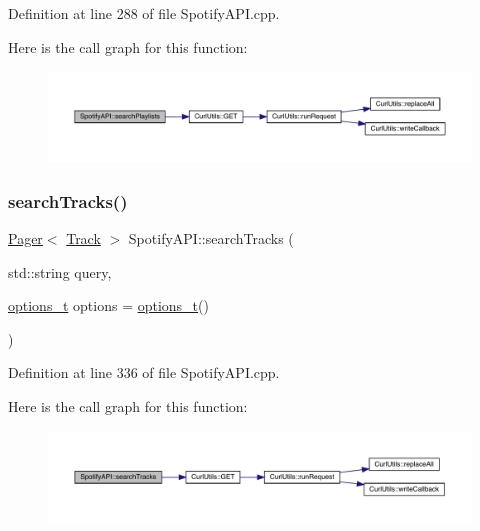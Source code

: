 Definition at line 288 of file Spotify\+A\+P\+I.\+cpp.

Here is the call graph for this function\+:
\nopagebreak
\begin{figure}[H]
\begin{center}
\leavevmode
\includegraphics[width=350pt]{class_spotify_a_p_i_ab2f004b11a4179e588137fc3187f569c_cgraph}
\end{center}
\end{figure}
\mbox{\label{class_spotify_a_p_i_a0ff3c9b7fbf9e7a4a29c8a7f692daaf1}} 
\subsubsection{\texorpdfstring{search\+Tracks()}{searchTracks()}}
{\footnotesize\ttfamily \mbox{\hyperlink{class_pager}{Pager}}$<$ \mbox{\hyperlink{class_track}{Track}} $>$ Spotify\+A\+P\+I\+::search\+Tracks (\begin{DoxyParamCaption}\item[{std\+::string}]{query,  }\item[{\mbox{\hyperlink{_spotify_a_p_i_8h_a0ff5cac1a4007bb330b7d9939650c283}{options\+\_\+t}}}]{options = {\ttfamily \mbox{\hyperlink{_spotify_a_p_i_8h_a0ff5cac1a4007bb330b7d9939650c283}{options\+\_\+t}}()} }\end{DoxyParamCaption})}



Definition at line 336 of file Spotify\+A\+P\+I.\+cpp.

Here is the call graph for this function\+:
\nopagebreak
\begin{figure}[H]
\begin{center}
\leavevmode
\includegraphics[width=350pt]{class_spotify_a_p_i_a0ff3c9b7fbf9e7a4a29c8a7f692daaf1_cgraph}
\end{center}
\end{figure}
\mbox{\label{class_spotify_a_p_i_ab800b2fa5d52fa5addb7b5f999392dd5}} 
